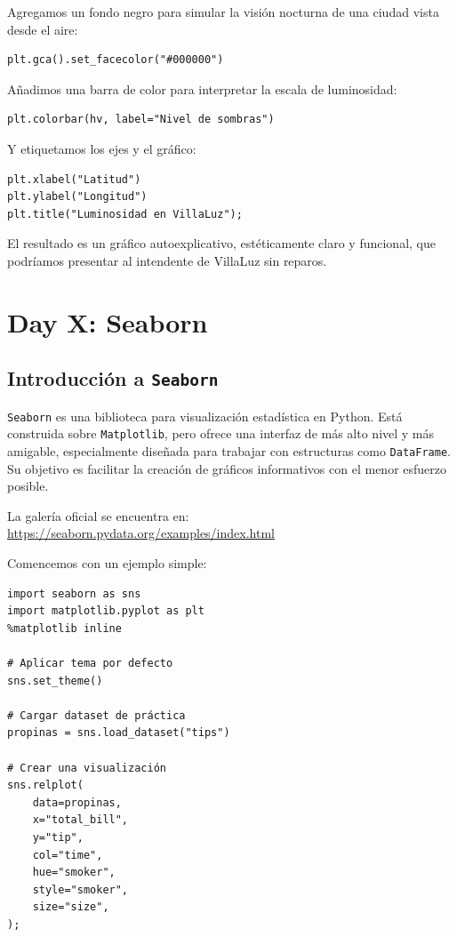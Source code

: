 \documentclass{article}
\theoremstyle{nonumberplain}
\begin{document}
Agregamos un fondo negro para simular la visión nocturna de una ciudad vista desde el aire:

\begin{verbatim}
plt.gca().set_facecolor("#000000")
\end{verbatim}

Añadimos una barra de color para interpretar la escala de luminosidad:

\begin{verbatim}
plt.colorbar(hv, label="Nivel de sombras")
\end{verbatim}

Y etiquetamos los ejes y el gráfico:

\begin{verbatim}
plt.xlabel("Latitud")
plt.ylabel("Longitud")
plt.title("Luminosidad en VillaLuz");
\end{verbatim}

El resultado es un gráfico autoexplicativo, estéticamente claro y funcional, que podríamos presentar al intendente de VillaLuz sin reparos.

\vspace{1em}

\section*{Day X: Seaborn}

\subsection*{Introducción a \texttt{Seaborn}}

\texttt{Seaborn} es una biblioteca para visualización estadística en Python. Está construida sobre \texttt{Matplotlib}, pero ofrece una interfaz de más alto nivel y más amigable, especialmente diseñada para trabajar con estructuras como \texttt{DataFrame}. Su objetivo es facilitar la creación de gráficos informativos con el menor esfuerzo posible.

La galería oficial se encuentra en: \url{https://seaborn.pydata.org/examples/index.html}

Comencemos con un ejemplo simple:

\begin{verbatim}
import seaborn as sns
import matplotlib.pyplot as plt
%matplotlib inline

# Aplicar tema por defecto
sns.set_theme()

# Cargar dataset de práctica
propinas = sns.load_dataset("tips")

# Crear una visualización
sns.relplot(
    data=propinas,
    x="total_bill",
    y="tip",
    col="time",
    hue="smoker",
    style="smoker",
    size="size",
);
\end{verbatim}
\end{document}
